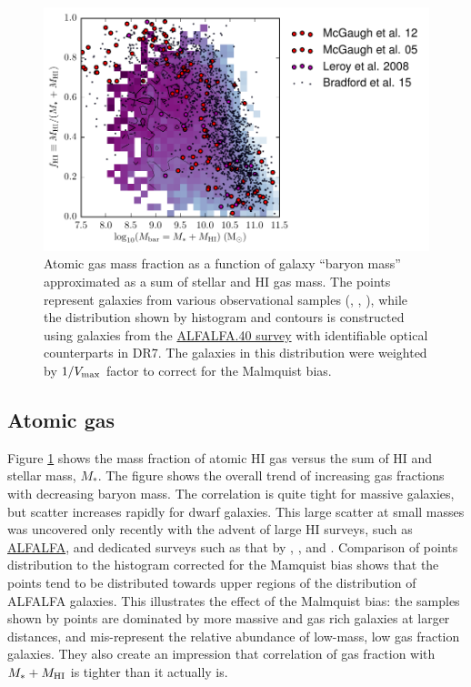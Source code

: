 \begin{figure}[t]
\centerline{
\includegraphics[scale=1.2]{fig/fgmb.pdf}}
\caption{Atomic gas mass fraction as a function of galaxy ``baryon mass'' approximated as a sum of stellar and HI gas mass. The points represent galaxies from various
observational samples (\href{http://adsabs.harvard.edu/abs/2012AJ....143...40M}{\citealt{mcgaugh_etal12}}, \href{http://adsabs.harvard.edu/abs/2008AJ....136.2782L}{\citealt{leroy_etal08}}, \href{http://adsabs.harvard.edu/abs/2015ApJ...809..146B}{\citealt{bradford_etal15}}), while the distribution shown by histogram and contours is constructed using galaxies from the \href{http://egg.astro.cornell.edu/alfalfa/index.php}{ALFALFA.40 survey} with identifiable optical counterparts in DR7. The galaxies in this distribution were weighted by $1/V_{\rm max}$ factor to correct for the Malmquist bias. \label{fig:fgmb}}
\end{figure}

\subsection{Atomic gas}

Figure \ref{fig:fgmb} shows the mass fraction of atomic HI gas versus  the sum of HI and stellar mass, $M_*$. The figure shows the overall trend of increasing gas fractions with decreasing baryon mass. The correlation is quite tight for massive galaxies, but scatter increases rapidly for dwarf galaxies. This large scatter at small masses was uncovered only recently with the advent of large HI surveys, such as \href{http://egg.astro.cornell.edu/alfalfa/index.php}{ALFALFA}, and dedicated surveys such as that by \href{http://adsabs.harvard.edu/abs/2012AJ....143...40M}{\citet{mcgaugh_etal12}},  \href{http://adsabs.harvard.edu/abs/2008AJ....136.2782L}{\citet{leroy_etal08}}, and \href{http://adsabs.harvard.edu/abs/2015ApJ...809..146B}{\citet{bradford_etal15}}. 
Comparison of points distribution to the histogram corrected for the Mamquist bias shows that the points tend to be distributed towards upper regions of the distribution of ALFALFA galaxies. This illustrates the effect of the Malmquist bias: the samples shown by points are dominated by more massive and gas rich galaxies at larger distances, and mis-represent the relative abundance of low-mass, low gas fraction galaxies. They also create an impression that correlation of gas fraction with $M_*+M_{\rm HI}$ is tighter than it actually is.

